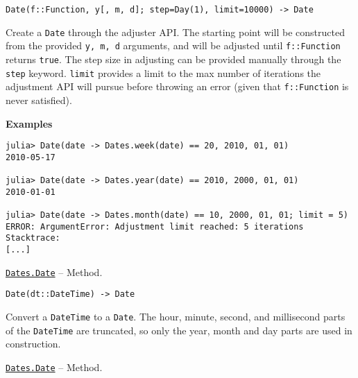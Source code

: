 \begin{adjustwidth}{2em}{0pt}


\begin{verbatim}
Date(f::Function, y[, m, d]; step=Day(1), limit=10000) -> Date
\end{verbatim}

Create a \texttt{Date} through the adjuster API. The starting point will be constructed from the provided \texttt{y, m, d} arguments, and will be adjusted until \texttt{f::Function} returns \texttt{true}. The step size in adjusting can be provided manually through the \texttt{step} keyword. \texttt{limit} provides a limit to the max number of iterations the adjustment API will pursue before throwing an error (given that \texttt{f::Function} is never satisfied).

\textbf{Examples}


\begin{verbatim}
julia> Date(date -> Dates.week(date) == 20, 2010, 01, 01)
2010-05-17

julia> Date(date -> Dates.year(date) == 2010, 2000, 01, 01)
2010-01-01

julia> Date(date -> Dates.month(date) == 10, 2000, 01, 01; limit = 5)
ERROR: ArgumentError: Adjustment limit reached: 5 iterations
Stacktrace:
[...]
\end{verbatim}



\end{adjustwidth}
\hypertarget{2036888574814255715}{} 
\hyperlink{2036888574814255715}{\texttt{Dates.Date}}  -- {Method.}

\begin{adjustwidth}{2em}{0pt}


\begin{verbatim}
Date(dt::DateTime) -> Date
\end{verbatim}

Convert a \texttt{DateTime} to a \texttt{Date}. The hour, minute, second, and millisecond parts of the \texttt{DateTime} are truncated, so only the year, month and day parts are used in construction.



\end{adjustwidth}
\hypertarget{8343259543700535183}{} 
\hyperlink{8343259543700535183}{\texttt{Dates.Date}}  -- {Method.}

